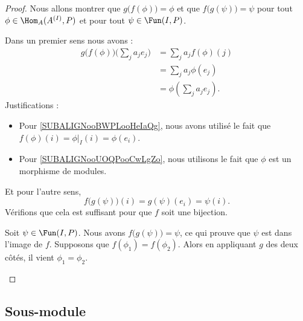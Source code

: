 \begin{proof}
	Nous allons montrer que \( g\big( f(\phi) \big)=\phi\) et que \( f\big( g(\psi) \big)=\psi\) pour tout \( \phi\in\Hom_A(A^{(I)},P)\) et pour tout \( \psi\in \Fun(I,P)\).

	Dans un premier sens nous avons :
	\begin{subequations}
		\begin{align}
			g\big( f(\phi) \big)\big( \sum_ja_je_j \big) & =\sum_ja_jf(\phi)(j)                                       \\
			                                             & =\sum_ja_j\phi(e_j)\label{SUBALIGNooBWPLooHeIaQg}          \\
			                                             & =\phi(\sum_ja_je_j)        \label{SUBALIGNooUOQPooCwLgZo}.
		\end{align}
	\end{subequations}
	Justifications :
	\begin{itemize}
		\item
		      Pour \eqref{SUBALIGNooBWPLooHeIaQg}, nous avons utilisé le fait que \( f(\phi)(i)=\phi|_I(i)=\phi(e_i)\).
		\item
		      Pour \eqref{SUBALIGNooUOQPooCwLgZo}, nous utilisons le fait que \( \phi\) est un morphisme de modules.
	\end{itemize}
	Et pour l'autre sens,
	\begin{equation}
		f\big( g(\psi) \big)(i)=g(\psi)(e_i)=\psi(i).
	\end{equation}
	Vérifions que cela est suffisant pour que \( f\) soit une bijection.
	\begin{subproof}
		\spitem[Surjectif]
		Soit \( \psi\in \Fun(I,P)\). Nous avons \( f\big( g(\psi) \big)=\psi\), ce qui prouve que \( \psi\) est dans l'image de \( f\).
		\spitem[Injectif]
		Supposons que \( f(\phi_1)=f(\phi_2)\). Alors en appliquant \( g\) des deux côtés, il vient \( \phi_1=\phi_2\).
	\end{subproof}
\end{proof}

\subsection{Sous-module}

